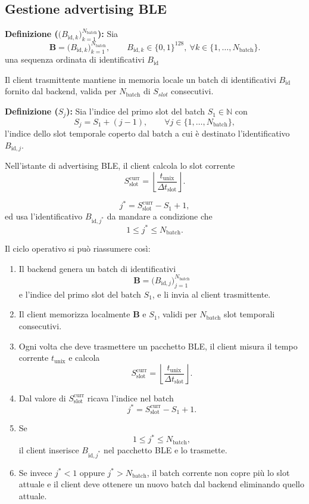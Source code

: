 \documentclass[a4paper,11pt]{article}
\begin{document}
\subsection{Gestione advertising BLE}
\textbf{Definizione (\(\bigl(B_{\text{id},k}\bigr)_{k=1}^{N_{\text{batch}}}\)):} Sia
\[
  \mathbf{B}
  = \bigl(B_{\text{id},k}\bigr)_{k=1}^{N_{\text{batch}}},
  \qquad B_{\text{id},k} \in \{0,1\}^{128},\ \forall k \in \{1,\dots,N_{\text{batch}}\}.
\]
una sequenza ordinata di identificativi $B_{\text{id}}$

Il client trasmittente mantiene in memoria locale un batch di identificativi \(B_{\text{id}}\) fornito dal backend, valida per $N_{\text{batch}}$ di $S_{slot}$ consecutivi.

\textbf{Definizione (\(S_j\)):} Sia l'indice del primo slot del batch \(S_1 \in \mathbb{N}\) con
\[
  S_j = S_1 + (j-1), \qquad \forall j \in \{1,\dots,N_{\text{batch}}\},
\]
l'indice dello slot temporale coperto dal batch a cui è destinato l'identificativo \(B_{\text{id},j}\).

Nell'istante di advertising BLE, il client calcola lo slot corrente
\[
  S_{\text{slot}}^{\text{curr}}
  = \left\lfloor \frac{t_{\text{unix}}}{\Delta t_{\text{slot}}} \right\rfloor.
\]

\[
  j^\ast = S_{\text{slot}}^{\text{curr}} - S_1 + 1,
\]
ed usa l'identificativo \(B_{\text{id},j^\ast}\) da mandare a condizione che
\[
  1 \le j^\ast \le N_{\text{batch}}.
\]

Il ciclo operativo si può riassumere così:
\begin{enumerate}
  \item Il backend genera un batch di identificativi
        \[
          \mathbf{B} = \bigl(B_{\text{id},j}\bigr)_{j=1}^{N_{\text{batch}}}
        \]
        e l'indice del primo slot del batch \(S_1\), e li invia al client trasmittente.

  \item Il client memorizza localmente \(\mathbf{B}\) e \(S_1\), validi per \(N_{\text{batch}}\) slot temporali consecutivi.

  \item Ogni volta che deve trasmettere un pacchetto BLE, il client misura il tempo corrente \(t_{\text{unix}}\) e calcola
        \[
          S_{\text{slot}}^{\text{curr}}
          = \left\lfloor \frac{t_{\text{unix}}}{\Delta t_{\text{slot}}} \right\rfloor.
        \]

  \item Dal valore di \(S_{\text{slot}}^{\text{curr}}\) ricava l’indice nel batch
        \[
          j^\ast = S_{\text{slot}}^{\text{curr}} - S_1 + 1.
        \]

  \item Se
        \[
          1 \le j^\ast \le N_{\text{batch}},
        \]
        il client inserisce \(B_{\text{id},j^\ast}\) nel pacchetto BLE e lo trasmette.

  \item Se invece \(j^\ast < 1\) oppure \(j^\ast > N_{\text{batch}}\), il batch corrente non copre più lo slot attuale e il client deve ottenere un nuovo batch dal backend eliminando quello attuale.
\end{enumerate}
\end{document}
